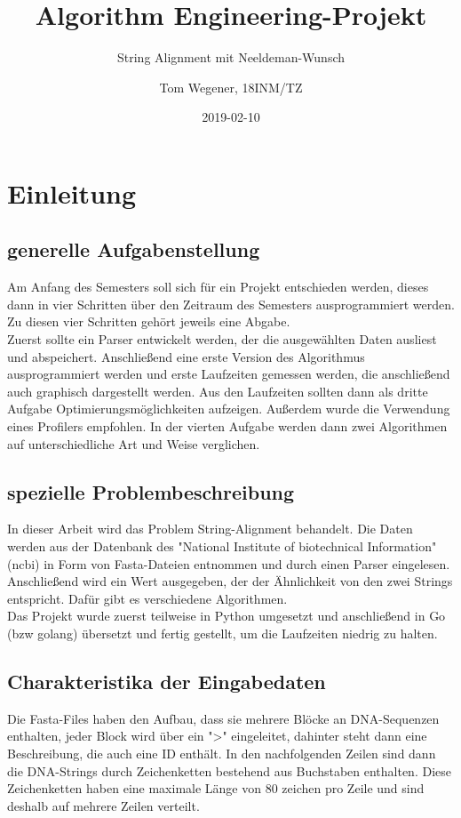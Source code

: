 \documentclass[a4paper]{article}
\title{Algorithm Engineering-Projekt}
\subtitle{String Alignment mit Neeldeman-Wunsch}
\date{2019-02-10}
\author{Tom Wegener, 18INM/TZ}
\begin{document}
\pagestyle{empty}

\maketitle

\newpage

\tableofcontents

\newpage

\pagestyle{fancy}

\setcounter{page}{1}

\section{Einleitung}
\subsection{generelle Aufgabenstellung}
Am Anfang des Semesters soll sich für ein Projekt entschieden werden, dieses dann in vier Schritten über den Zeitraum des Semesters ausprogrammiert werden. Zu diesen vier Schritten gehört jeweils eine Abgabe. \\
Zuerst sollte ein Parser entwickelt werden, der die ausgewählten Daten ausliest und abspeichert. Anschließend eine erste Version des Algorithmus ausprogrammiert werden und erste Laufzeiten gemessen werden, die anschließend auch graphisch dargestellt werden. Aus den Laufzeiten sollten dann als dritte Aufgabe Optimierungsmöglichkeiten aufzeigen. Außerdem wurde die Verwendung eines Profilers empfohlen. In der vierten Aufgabe werden dann zwei Algorithmen auf unterschiedliche Art und Weise verglichen.

\subsection{spezielle Problembeschreibung}
In dieser Arbeit wird das Problem String-Alignment behandelt. Die Daten werden aus der Datenbank des "National Institute of biotechnical Information" (ncbi) in Form von Fasta-Dateien entnommen und durch einen Parser eingelesen. \\
Anschließend wird ein Wert ausgegeben, der der Ähnlichkeit von den zwei Strings entspricht.
Dafür gibt es verschiedene Algorithmen.\\
Das Projekt wurde zuerst teilweise in Python umgesetzt und anschließend in Go (bzw golang) übersetzt und fertig gestellt, um die Laufzeiten niedrig zu halten.

\subsection{Charakteristika der Eingabedaten}
Die Fasta-Files haben den Aufbau, dass sie mehrere Blöcke an DNA-Sequenzen enthalten, jeder Block wird über ein ">" eingeleitet, dahinter steht dann eine Beschreibung, die auch eine ID enthält. In den nachfolgenden Zeilen sind dann die DNA-Strings durch Zeichenketten bestehend aus Buchstaben enthalten. Diese Zeichenketten haben eine maximale Länge von 80 zeichen pro Zeile und sind deshalb auf mehrere Zeilen verteilt.
\end{document}
